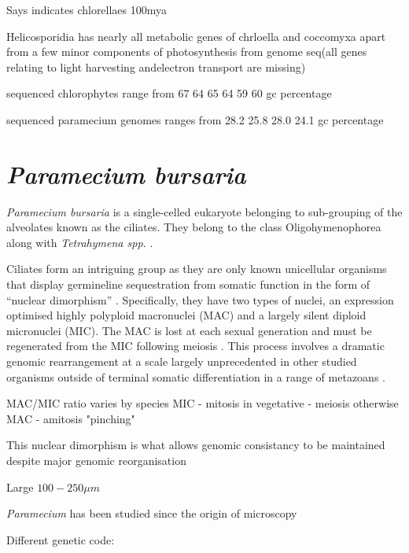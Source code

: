 Says \citep{DeWever2009} indicates chlorellaes 100mya \citep{Pombert2014}

Helicosporidia has nearly all metabolic genes of chrloella and coccomyxa apart from
a few minor components of photosynthesis \citep{Pombert2014} from genome seq(all genes relating to light harvesting andelectron transport are missing)




sequenced chlorophytes range from  67 64 65 64 59 60 gc percentage \citep{Blanc2010a}

sequenced paramecium genomes ranges from 28.2 25.8 28.0 24.1 gc percentage \citep{McGrath2014}







\section{\textit{Paramecium bursaria}}

\textit{Paramecium bursaria} is a single-celled eukaryote belonging to sub-grouping of the alveolates known
as the ciliates. They belong to the class Oligohymenophorea along with \textit{Tetrahymena spp.} \citep{Jahn2002}.

Ciliates form an intriguing group as they are only known unicellular organisms that display germineline 
sequestration from somatic function in the form of ``nuclear dimorphism'' \citep{Jahn2002}.
Specifically, they have two types of nuclei, an expression optimised highly polyploid macronuclei (MAC)
and a largely silent diploid micronuclei (MIC).  The MAC is lost at each sexual generation
and must be regenerated from the MIC following meiosis \citep{Aury2006}.
This process involves a dramatic genomic rearrangement at a scale largely unprecedented in other studied organisms
outside of terminal somatic differentiation in a range of metazoans \citep{Jahn2002}.


MAC/MIC ratio varies by species %
MIC - mitosis in vegetative - meiosis otherwise
MAC - amitosis "pinching"

This nuclear dimorphism is what allows genomic consistancy to be maintained despite major genomic reorganisation

Large \(100-250\mu m\) 


\textit{Paramecium} has been studied since the origin of microscopy \citep{Gortz2009}


Different genetic code:



